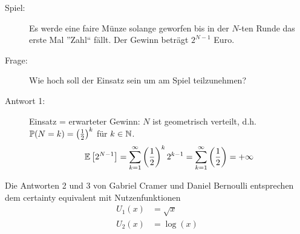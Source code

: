 


\begin{description}
	\item[Spiel:] Es werde eine faire Münze solange geworfen bis in der $N$-ten Runde das erste Mal ''Zahl`` fällt. Der Gewinn beträgt $2^{N-1}$ Euro.
	\item[Frage:] Wie hoch soll der Einsatz sein um am Spiel teilzunehmen?
	\item[Antwort 1:] Einsatz = erwarteter Gewinn: $N$ ist geometrisch verteilt, d.h. $\mathbb{P}(N = k) = \left( \frac{1}{2} \right)^k$ für $k \in \mathbb{N}$.
	\begin{equation*}
		\mathbb{E} \left[ 2^{N-1} \right] 
		= \sum_{k=1}^\infty \left( \frac{1}{2} \right)^k 2^{k-1} 
		= \sum_{k=1}^\infty \left( \frac{1}{2} \right) 
		= + \infty
	\end{equation*}
\end{description}

Die Antworten 2 und 3 von Gabriel Cramer und Daniel Bernoulli entsprechen dem certainty equivalent mit Nutzenfunktionen
\begin{align*}
		U_1(x) &= \sqrt{x} \tag{Cramer} \\
		U_2(x) &= \log(x) \tag{Bernoulli}
\end{align*}


